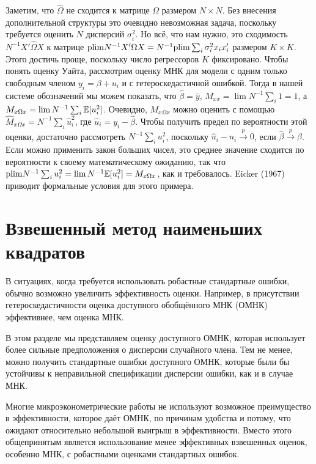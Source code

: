 Заметим, что $\hat{\Omega}$ не сходится к матрице $\Omega$ размером $N \times N$. Без внесения дополнительной структуры это очевидно невозможная задача, поскольку требуется оценить $N$ дисперсий $\sigma_i^2$. Но всё, что нам нужно, это сходимость $N^{-1} X' \hat{\Omega} X$ к матрице $\mathrm{plim } N^{-1} X' \Omega X =  N^{-1} \mathrm{plim } \sum_i \sigma_i^2 x_i x_i'$  размером $K \times K$. Этого достичь проще, поскольку число регрессоров $K$ фиксировано. Чтобы понять оценку Уайта, рассмотрим оценку МНК для модели с одним только свободным членом $y_i = \beta + u_i$ и с гетероскедастичной ошибкой. Тогда в нашей системе обозначений мы можем показать, что $\hat{\beta} = \bar{y}$, $M_{xx} = \lim N^{-1} \sum_{i} 1 = 1$, а $M_{x \Omega x} = \lim N^{-1} \sum_{i} \mathbb{E}[u_i^2]$. Очевидно, $M_{x \Omega x}$ можно оценить с помощью $\hat{M}_{x \Omega x} = N^{-1} \sum_{i} \hat{u}_i^2$, где $ \hat{u}_i = y_i-\hat{\beta}$. Чтобы получить предел по вероятности этой оценки, достаточно рассмотреть $N^{-1}\sum_i u_i^2$, поскольку $\hat{u}_i - u_i \xrightarrow{p} 0$, если $\hat{\beta}\xrightarrow{p}\beta$. Если можно применить закон больших чисел, это среднее значение сходится по вероятности к своему математическому ожиданию, так что $\mathrm{plim } N^{-1} \sum_i u_i^2 = \lim N^{-1} \mathbb{E}[u_i^2] = M_{x \Omega x}$, как и требовалось. Eicker (1967) приводит формальные условия для этого примера.

\section{Взвешенный метод наименьших квадратов}

В ситуациях, когда требуется использовать робастные стандартные ошибки, обычно возможно увеличить эффективность оценки. Например, в присутствии гетероскедастичности оценка доступного обобщённого МНК (ОМНК) эффективнее, чем оценка МНК.

В этом разделе мы представляем оценку доступного ОМНК, которая использует более сильные предположения о дисперсии случайного члена. Тем не менее, можно получить стандартные ошибки доступного ОМНК, которые были бы устойчивы к неправильной спецификации дисперсии ошибки, как и в случае МНК.

Многие микроэконометрические работы не используют возможное преимущество в эффективности, которое даёт ОМНК, по причинам удобства и потому, что ожидают относительно небольшой выигрыш в эффективности. Вместо этого общепринятым является использование менее эффективных взвешенных оценок, особенно МНК, с робастными оценками стандартных ошибок.

